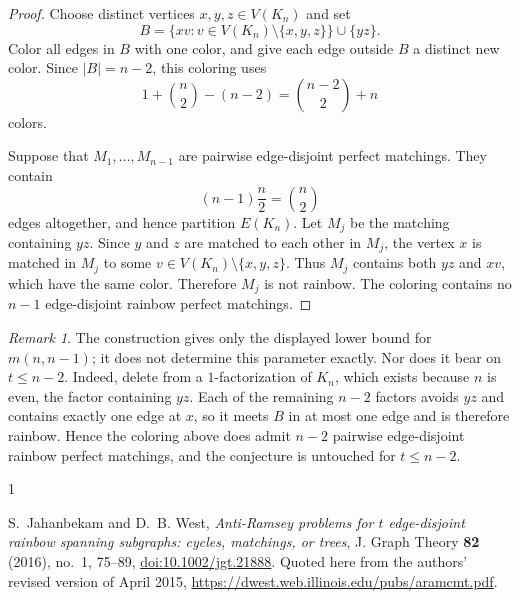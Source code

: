 \documentclass[11pt]{amsart}
\theoremstyle{remark}
\newtheorem*{remark}{Remark}
\begin{document}
\begin{proof}
Choose distinct vertices $x,y,z\in V(K_n)$ and set
\[
  B=\{xv:v\in V(K_n)\setminus\{x,y,z\}\}\cup\{yz\}.
\]
Color all edges in $B$ with one color, and give each edge outside $B$ a
distinct new color. Since $|B|=n-2$, this coloring uses
\[
  1+\binom{n}{2}-(n-2)=\binom{n-2}{2}+n
\]
colors.

Suppose that $M_1,\ldots,M_{n-1}$ are pairwise edge-disjoint perfect
matchings. They contain
\[
  (n-1)\frac n2=\binom n2
\]
edges altogether, and hence partition $E(K_n)$. Let $M_j$ be the matching
containing $yz$. Since $y$ and $z$ are matched to each other in $M_j$,
the vertex $x$ is matched in $M_j$ to some
$v\in V(K_n)\setminus\{x,y,z\}$. Thus $M_j$ contains both $yz$ and $xv$,
which have the same color. Therefore $M_j$ is not rainbow. The coloring
contains no $n-1$ edge-disjoint rainbow perfect matchings.
\end{proof}

\begin{remark}
The construction gives only the displayed lower bound for $m(n,n-1)$; it
does not determine this parameter exactly. Nor does it bear on $t\le n-2$.
Indeed, delete from a $1$-factorization of $K_n$, which exists because $n$
is even, the factor containing $yz$. Each of the remaining $n-2$ factors
avoids $yz$ and contains exactly one edge at $x$, so it meets $B$ in at
most one edge and is therefore rainbow. Hence the coloring above does
admit $n-2$ pairwise edge-disjoint rainbow perfect matchings, and the
conjecture is untouched for $t\le n-2$.
\end{remark}

\begin{thebibliography}{1}

S.~Jahanbekam and D.~B. West,
\newblock \emph{Anti-Ramsey problems for $t$ edge-disjoint rainbow spanning
subgraphs: cycles, matchings, or trees},
\newblock J. Graph Theory \textbf{82} (2016), no.~1, 75--89,
\newblock
\href{https://doi.org/10.1002/jgt.21888}{doi:10.1002/jgt.21888}.
\newblock Quoted here from the authors' revised version of April 2015,
\url{https://dwest.web.illinois.edu/pubs/aramcmt.pdf}.

\end{thebibliography}
\end{document}
